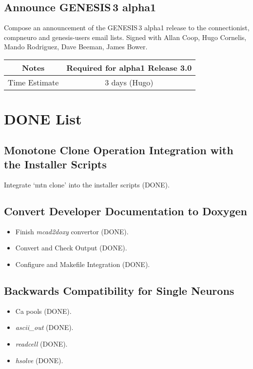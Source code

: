 \documentclass[12pt]{article}
\begin{document}
\subsection{Announce GENESIS\,3 alpha1}

Compose an announcement of the GENESIS\,3 alpha1 release to the
connectionist, compneuro and genesis-users email lists.  Signed with
Allan Coop, Hugo Cornelis, Mando Rodriguez, Dave Beeman, James Bower.

{
  \vspace{5mm}
  \centering
  \begin{tabular}{|c|c|}
    \hline
    Notes
    & Required for alpha1 Release 3.0 \\
    \hline
    Time Estimate
    & 3 days (Hugo) \\
    \hline
  \end{tabular}
}


\section{DONE List}

\subsection{Monotone Clone Operation Integration with the Installer Scripts}
Integrate `mtn clone' into the installer scripts (DONE).

\subsection{Convert Developer Documentation to Doxygen}

\begin{itemize}
\item Finish {\it mcad2doxy} convertor (DONE).
\item Convert and Check Output (DONE).
\item Configure and Makefile Integration (DONE).
\end{itemize}

\subsection{Backwards Compatibility for Single Neurons}

\begin{itemize}
\item Ca pools (DONE).
\item {\it ascii\_out} (DONE).
\item {\it readcell} (DONE).
\item {\it hsolve} (DONE).
\end{itemize}
\end{document}
